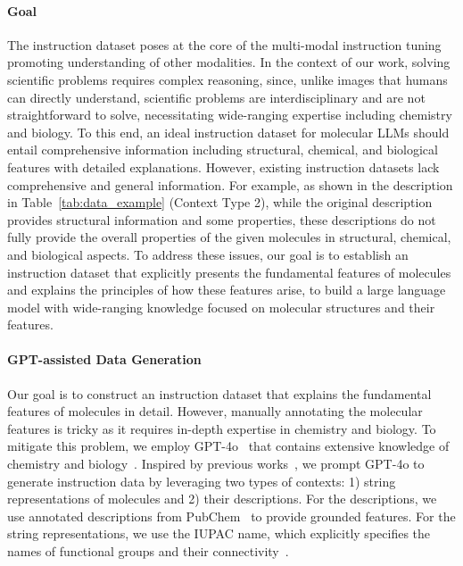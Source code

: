\paragraph{Goal} 
The instruction dataset poses at the core of the multi-modal instruction tuning promoting understanding of other modalities. In the context of our work, solving scientific problems requires complex reasoning, since, unlike images that humans can directly understand, scientific problems are interdisciplinary and are not straightforward to solve, necessitating wide-ranging expertise including chemistry and biology. To this end, an ideal instruction dataset for molecular LLMs should entail comprehensive information including structural, chemical, and biological features with detailed explanations. However, existing instruction datasets lack comprehensive and general information. For example, as shown in the description in Table~\ref{tab:data_example} (Context Type 2), while the original description provides structural information and some properties, these descriptions do not fully provide the overall properties of the given molecules in structural, chemical, and biological aspects. To address these issues, our goal is to establish an instruction dataset that explicitly presents the fundamental features of molecules and explains the principles of how these features arise, to build a large language model with wide-ranging knowledge focused on molecular structures and their features.



\vspace{-0.05in}
\paragraph{GPT-assisted Data Generation}
Our goal is to construct an instruction dataset that explains the fundamental features of molecules in detail. However, manually annotating the molecular features is tricky as it requires in-depth expertise in chemistry and biology. To mitigate this problem, we employ GPT-4o~\cite{openai2024gpt4ocard} that contains extensive knowledge of chemistry and biology~\cite{ai4science2023impactlargelanguagemodels}. Inspired by previous works~\cite{liu2024LLAVA,park2024llamo}, we prompt GPT-4o to generate instruction data by leveraging two types of contexts: 1) string representations of molecules and 2) their descriptions. For the descriptions, we use annotated descriptions from PubChem~\cite{kim2021pubchem} to provide grounded features. For the string representations, we use the IUPAC name, which explicitly specifies the names of functional groups and their connectivity~\cite{favre2013iupac}. 

